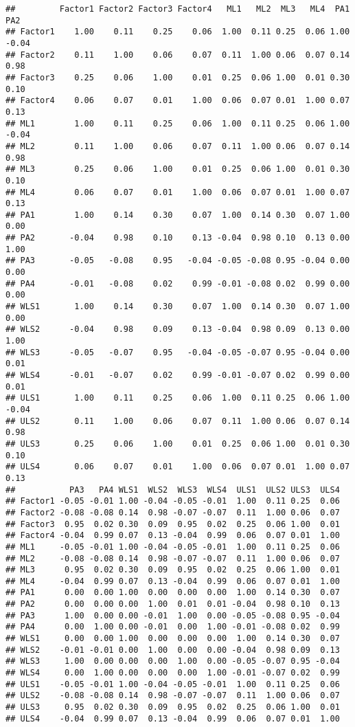 \documentclass[]{book}
\begin{document}
\begin{verbatim}
##         Factor1 Factor2 Factor3 Factor4   ML1   ML2  ML3   ML4  PA1   PA2
## Factor1    1.00    0.11    0.25    0.06  1.00  0.11 0.25  0.06 1.00 -0.04
## Factor2    0.11    1.00    0.06    0.07  0.11  1.00 0.06  0.07 0.14  0.98
## Factor3    0.25    0.06    1.00    0.01  0.25  0.06 1.00  0.01 0.30  0.10
## Factor4    0.06    0.07    0.01    1.00  0.06  0.07 0.01  1.00 0.07  0.13
## ML1        1.00    0.11    0.25    0.06  1.00  0.11 0.25  0.06 1.00 -0.04
## ML2        0.11    1.00    0.06    0.07  0.11  1.00 0.06  0.07 0.14  0.98
## ML3        0.25    0.06    1.00    0.01  0.25  0.06 1.00  0.01 0.30  0.10
## ML4        0.06    0.07    0.01    1.00  0.06  0.07 0.01  1.00 0.07  0.13
## PA1        1.00    0.14    0.30    0.07  1.00  0.14 0.30  0.07 1.00  0.00
## PA2       -0.04    0.98    0.10    0.13 -0.04  0.98 0.10  0.13 0.00  1.00
## PA3       -0.05   -0.08    0.95   -0.04 -0.05 -0.08 0.95 -0.04 0.00  0.00
## PA4       -0.01   -0.08    0.02    0.99 -0.01 -0.08 0.02  0.99 0.00  0.00
## WLS1       1.00    0.14    0.30    0.07  1.00  0.14 0.30  0.07 1.00  0.00
## WLS2      -0.04    0.98    0.09    0.13 -0.04  0.98 0.09  0.13 0.00  1.00
## WLS3      -0.05   -0.07    0.95   -0.04 -0.05 -0.07 0.95 -0.04 0.00  0.01
## WLS4      -0.01   -0.07    0.02    0.99 -0.01 -0.07 0.02  0.99 0.00  0.01
## ULS1       1.00    0.11    0.25    0.06  1.00  0.11 0.25  0.06 1.00 -0.04
## ULS2       0.11    1.00    0.06    0.07  0.11  1.00 0.06  0.07 0.14  0.98
## ULS3       0.25    0.06    1.00    0.01  0.25  0.06 1.00  0.01 0.30  0.10
## ULS4       0.06    0.07    0.01    1.00  0.06  0.07 0.01  1.00 0.07  0.13
##           PA3   PA4 WLS1  WLS2  WLS3  WLS4  ULS1  ULS2 ULS3  ULS4
## Factor1 -0.05 -0.01 1.00 -0.04 -0.05 -0.01  1.00  0.11 0.25  0.06
## Factor2 -0.08 -0.08 0.14  0.98 -0.07 -0.07  0.11  1.00 0.06  0.07
## Factor3  0.95  0.02 0.30  0.09  0.95  0.02  0.25  0.06 1.00  0.01
## Factor4 -0.04  0.99 0.07  0.13 -0.04  0.99  0.06  0.07 0.01  1.00
## ML1     -0.05 -0.01 1.00 -0.04 -0.05 -0.01  1.00  0.11 0.25  0.06
## ML2     -0.08 -0.08 0.14  0.98 -0.07 -0.07  0.11  1.00 0.06  0.07
## ML3      0.95  0.02 0.30  0.09  0.95  0.02  0.25  0.06 1.00  0.01
## ML4     -0.04  0.99 0.07  0.13 -0.04  0.99  0.06  0.07 0.01  1.00
## PA1      0.00  0.00 1.00  0.00  0.00  0.00  1.00  0.14 0.30  0.07
## PA2      0.00  0.00 0.00  1.00  0.01  0.01 -0.04  0.98 0.10  0.13
## PA3      1.00  0.00 0.00 -0.01  1.00  0.00 -0.05 -0.08 0.95 -0.04
## PA4      0.00  1.00 0.00 -0.01  0.00  1.00 -0.01 -0.08 0.02  0.99
## WLS1     0.00  0.00 1.00  0.00  0.00  0.00  1.00  0.14 0.30  0.07
## WLS2    -0.01 -0.01 0.00  1.00  0.00  0.00 -0.04  0.98 0.09  0.13
## WLS3     1.00  0.00 0.00  0.00  1.00  0.00 -0.05 -0.07 0.95 -0.04
## WLS4     0.00  1.00 0.00  0.00  0.00  1.00 -0.01 -0.07 0.02  0.99
## ULS1    -0.05 -0.01 1.00 -0.04 -0.05 -0.01  1.00  0.11 0.25  0.06
## ULS2    -0.08 -0.08 0.14  0.98 -0.07 -0.07  0.11  1.00 0.06  0.07
## ULS3     0.95  0.02 0.30  0.09  0.95  0.02  0.25  0.06 1.00  0.01
## ULS4    -0.04  0.99 0.07  0.13 -0.04  0.99  0.06  0.07 0.01  1.00
\end{verbatim}
\end{document}
